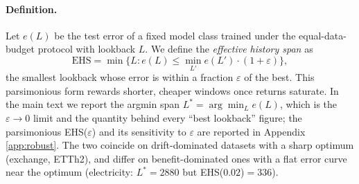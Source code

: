 \paragraph{Definition.}
Let $e(L)$ be the test error of a fixed model class trained under the equal-data-budget protocol with lookback $L$. We define the \emph{effective history span} as
\begin{equation}
\mathrm{EHS} = \min\Big\{L : e(L) \le \min_{L'} e(L') \cdot (1 + \varepsilon)\Big\},
\label{eq:ehs}
\end{equation}
the smallest lookback whose error is within a fraction $\varepsilon$ of the best. This parsimonious form rewards shorter, cheaper windows once returns saturate. In the main text we report the argmin span $L^* = \arg\min_L e(L)$, which is the $\varepsilon \to 0$ limit and the quantity behind every ``best lookback'' figure; the parsimonious EHS($\varepsilon$) and its sensitivity to $\varepsilon$ are reported in Appendix \ref{app:robust}. The two coincide on drift-dominated datasets with a sharp optimum (exchange, ETTh2), and differ on benefit-dominated ones with a flat error curve near the optimum (electricity: $L^*{=}2880$ but EHS($0.02$)${=}336$).
